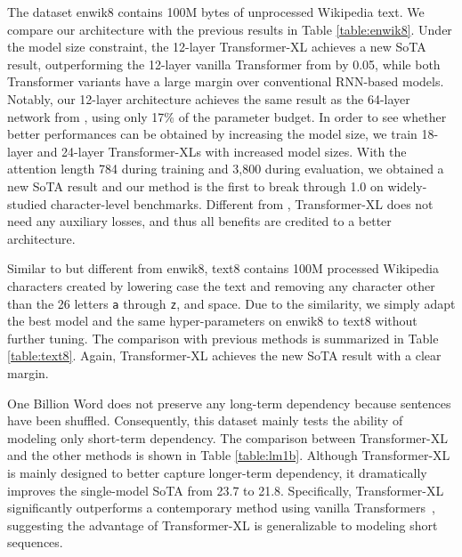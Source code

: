 The dataset enwik8 contains 100M bytes of unprocessed Wikipedia text.
We compare our architecture with the previous results in Table \ref{table:enwik8}.
Under the model size constraint, the 12-layer Transformer-XL achieves a new SoTA result, outperforming the 12-layer vanilla Transformer from \citet{al2018character} by 0.05, while both Transformer variants have a large margin over conventional RNN-based models.
Notably, our 12-layer architecture achieves the same result as the 64-layer network from \citet{al2018character}, using only 17\% of the parameter budget.
In order to see whether better performances can be obtained by increasing the model size, we train 18-layer and 24-layer Transformer-XLs with increased model sizes.
With the attention length 784 during training and 3,800 during evaluation, we obtained a new SoTA result and our method is the first to break through 1.0 on widely-studied character-level benchmarks.
Different from \citet{al2018character}, Transformer-XL does not need any auxiliary losses, and thus all benefits are credited to a better architecture.

Similar to but different from enwik8, text8 contains 100M processed Wikipedia characters created by lowering case the text and removing any character other than the 26 letters \texttt{a} through \texttt{z}, and space.
Due to the similarity, we simply adapt the best model and the same hyper-parameters on enwik8 to text8 without further tuning.
The comparison with previous methods is summarized in Table \ref{table:text8}.
Again, Transformer-XL achieves the new SoTA result with a clear margin.

One Billion Word does not preserve any long-term dependency because sentences have been shuffled. Consequently, this dataset mainly tests the ability of modeling only short-term dependency.
The comparison between Transformer-XL and the other methods is shown in Table \ref{table:lm1b}.
Although Transformer-XL is mainly designed to better capture longer-term dependency, it dramatically improves the single-model SoTA from 23.7 to 21.8.
Specifically, Transformer-XL significantly outperforms a contemporary method using vanilla Transformers~\cite{baevski2018adaptive}, suggesting the advantage of Transformer-XL is generalizable to modeling short sequences.

